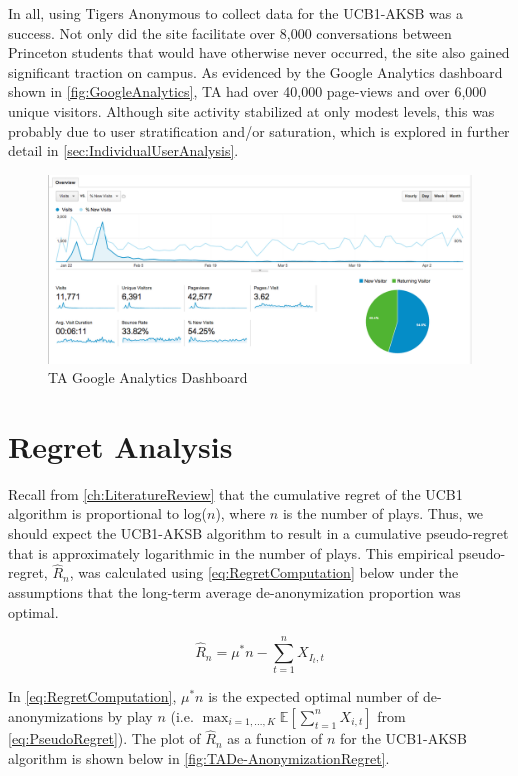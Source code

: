 In all, using Tigers Anonymous to collect data for the UCB1-AKSB was a success. Not only did the site facilitate over 8,000 conversations between Princeton students that would have otherwise never occurred, the site also gained significant traction on campus. As evidenced by the Google Analytics dashboard shown in \autoref{fig:GoogleAnalytics}, TA had over 40,000 page-views and over 6,000 unique visitors. Although site activity stabilized at only modest levels, this was probably due to user stratification and/or saturation, which is explored in further detail in \autoref{sec:IndividualUserAnalysis}.

\begin{figure}[H]
\centering
\includegraphics[trim= 0mm 0mm 0mm 0mm, clip, scale=0.3]{./Figures/GoogleAnalytics}
\caption{TA Google Analytics Dashboard}
\label{fig:GoogleAnalytics}
\end{figure}

\section{Regret Analysis}
\label{sec:RegretAnalysis}

Recall from \autoref{ch:LiteratureReview} that the cumulative regret of the UCB1 algorithm is proportional to log($n$), where $n$ is the number of plays. Thus, we should expect the UCB1-AKSB algorithm to result in a cumulative pseudo-regret that is approximately logarithmic in the number of plays. This empirical pseudo-regret, $\hat{R}_n$, was calculated using \autoref{eq:RegretComputation} below under the assumptions that the long-term average de-anonymization proportion was optimal.

\begin{equation}
\label{eq:RegretComputation}
\hat{R}_n = \mu^{*}n - \sum_{t=1}^{n}{X_{I_t, t}}
\end{equation}

In \autoref{eq:RegretComputation}, $\mu^{*}n$ is the expected optimal number of de-anonymizations by play $n$ (i.e. $\max_{i=1,...,K}{\mathbb{E}\left[\sum_{t=1}^{n}{X_{i, t}}\right]}$ from \autoref{eq:PseudoRegret}). The plot of $\hat{R}_n$ as a function of $n$ for the UCB1-AKSB algorithm is shown below in \autoref{fig:TADe-AnonymizationRegret}.

